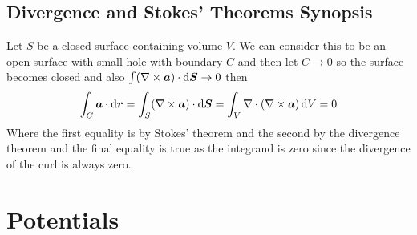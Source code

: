 \documentclass{article}
\begin{document}
    \subsection{Divergence and Stokes' Theorems Synopsis}
    Let \(S\) be a closed surface containing volume \(V\).
    We can consider this to be an open surface with small hole with boundary \(C\) and then let \(C\to 0\) so the surface becomes closed and also \(\int(\nabla\times\bm{a})\cdot\dd\bm{S}\to 0\) then
    \[\int_C\bm{a}\cdot\dd\bm{r} = \int_S(\nabla\times\bm{a})\cdot\dd\bm{S} = \int_V\nabla\cdot(\nabla\times\bm{a})\,\dd V = 0\]
    Where the first equality is by Stokes' theorem and the second by the divergence theorem and the final equality is true as the integrand is zero since the divergence of the curl is always zero.
    
    \section{Potentials}
\end{document}

